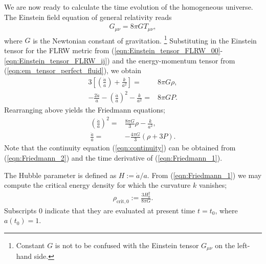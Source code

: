 We are now ready to calculate the time evolution of the homogeneous universe. The Einstein field equation of general relativity reads
\begin{align}
	G_{\mu\nu} = 8\pi G T_{\mu\nu},
\end{align}
where $G$ is the Newtonian constant of gravitation. \footnote{Constant $G$ is not to be confused with the Einstein tensor $G_{\mu\nu}$ on the left-hand side.} Substituting in the Einstein tensor for the FLRW metric from (\ref{eqn:Einstein_tensor_FLRW_00}-\ref{eqn:Einstein_tensor_FLRW_ij}) and the energy-momentum tensor from (\ref{eqn:em_tensor_perfect_fluid}), we obtain
\begin{align}
	3 \left[ \left(\frac{\dot{a}}{a}\right) + \frac{k}{a^2} \right] =& 8\pi G \rho, \\
	-\frac{2\ddot{a}}{a} - \left(\frac{\dot{a}}{a}\right)^2 - \frac{k}{a^2} =& 8\pi G P.
\end{align}
Rearranging above yields the Friedmann equations;
\begin{align}
	\left(\frac{\dot{a}}{a}\right)^2 =& \frac{8\pi G}{3}\rho - \frac{k}{a^2}, \label{eqn:Friedmann_1}\\
	\frac{\ddot{a}}{a} =& - \frac{4\pi G}{3} \left(\rho + 3P\right). \label{eqn:Friedmann_2}
\end{align}
Note that the continuity equation (\ref{eqn:continuity}) can be obtained from (\ref{eqn:Friedmann_2}) and the time derivative of (\ref{eqn:Friedmann_1}).

The Hubble parameter is defined as $H := \dot{a}/a$. From (\ref{eqn:Friedmann_1}) we may compute the critical energy density for which the curvature $k$ vanishes;
\begin{align}
	\rho_{\text{crit},0} := \frac{3H_0^2}{8\pi G}.
\end{align}
Subscripts $0$ indicate that they are evaluated at present time $t=t_0$, where $a(t_0)=1$.

